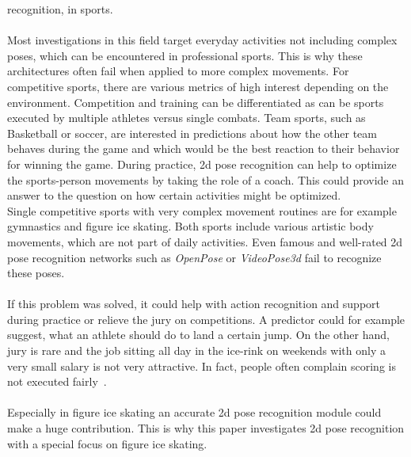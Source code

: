 recognition, in sports.
\\\mbox{}\\
Most investigations in this field target everyday activities not including complex poses, which can be encountered in
professional sports.
This is why these architectures often fail when applied to more complex movements.
For competitive sports, there are various metrics of high interest depending on the environment.
Competition and training can be differentiated as can be sports executed by multiple athletes versus single combats.
Team sports, such as Basketball or soccer, are interested in predictions about
how the other team behaves during the game and which would be the best reaction to their behavior for winning
the game.
During practice, 2d pose recognition can help to optimize the sports-person movements by taking the role of a coach.
This could provide an answer to the question on how certain activities might be optimized. \\
Single competitive sports with very complex movement routines are for example gymnastics and figure ice skating.
Both sports include various artistic body movements, which are not part of daily activities.
Even famous and well-rated 2d pose recognition networks such as \textit{OpenPose} or \textit{VideoPose3d} fail to recognize these
poses.
\\\mbox{}\\
If this problem was solved, it could help with action recognition and support during practice or relieve the jury
on competitions.
A predictor could for example suggest, what an athlete should do to land a certain jump.
On the other hand, jury is rare and the job sitting all day in the ice-rink on weekends with only a very small
salary is not very attractive.
In fact, people often complain scoring is not executed fairly~\cite{ungerjuryinterview, juryunger3minutes, unfairjudge}.
\\\mbox{}\\
Especially in figure ice skating an accurate 2d pose recognition module could make a huge contribution.
This is why this paper investigates 2d pose recognition with a special focus on figure ice skating.
%




